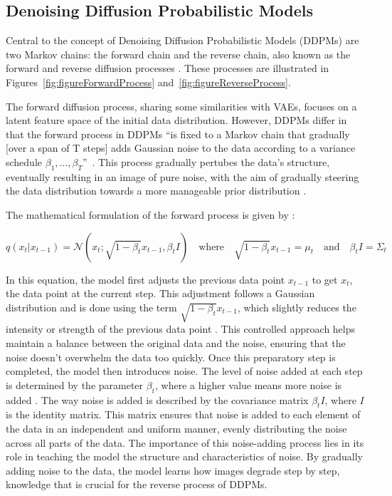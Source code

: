 \subsection{Denoising Diffusion Probabilistic Models}\label{DDPMs}

Central to the concept of Denoising Diffusion Probabilistic Models (DDPMs) are two Markov chains: the forward chain and the reverse chain, also known as the forward and reverse diffusion processes \citep{sohlDDPM}. These processes are illustrated in Figures~\ref{fig:figureForwardProcess} and~\ref{fig:figureReverseProcess}. 

The forward diffusion process, sharing some similarities with VAEs, focuses on a latent feature space of the initial data distribution. However, DDPMs differ in that the forward process in DDPMs ``is fixed to a Markov chain that gradually [over a span of T steps] adds Gaussian noise to the data according to a variance schedule \(\beta_1, \ldots, \beta_T \)''~\cite{hoDDPMs}. This process gradually pertubes the data's structure, eventually resulting in an image of pure noise, with the aim of gradually steering the data distribution towards a more manageable prior distribution \citep{yangdiffusionSummary, pooleDreamfusion}. 

The mathematical formulation of the forward process is given by \citeauthor{martinez2023understanding}:

\[
q(x_t | x_{t-1}) = \mathcal{N}(x_t; \sqrt{1 - \beta_t}x_{t-1}, \beta_t I) \quad \text{where} \quad \sqrt{1 - \beta_t}x_{t-1} = \mu_t \quad \text{and} \quad \beta_t I = \Sigma_t
\] 

In this equation, the model first adjusts the previous data point \( x_{t-1} \) to get \( x_t \), the data point at the current step. This adjustment follows a Gaussian distribution and is done using the term \( \sqrt{1 - \beta_t} x_{t-1} \), which slightly reduces the intensity or strength of the previous data point \citep{sohlDDPM, hoDDPMs}. This controlled approach helps maintain a balance between the original data and the noise, ensuring that the noise doesn't overwhelm the data too quickly. Once this preparatory step is completed, the model then introduces noise. The level of noise added at each step is determined by the parameter \( \beta_t \), where a higher value means more noise is added \citep{kingma2023variationalDM}. The way noise is added is described by the covariance matrix \( \beta_t I \), where \( I \) is the identity matrix. This matrix ensures that noise is added to each element of the data in an independent and uniform manner, evenly distributing the noise across all parts of the data. The importance of this noise-adding process lies in its role in teaching the model the structure and characteristics of noise. By gradually adding noise to the data, the model learns how images degrade step by step, knowledge that is crucial for the reverse process of DDPMs.

